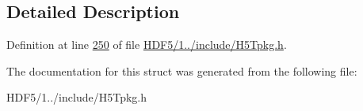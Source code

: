 \subsection{Detailed Description}


Definition at line \hyperlink{_h_d_f5_21_810_81_2include_2_h5_tpkg_8h_source_l00250}{250} of file \hyperlink{_h_d_f5_21_810_81_2include_2_h5_tpkg_8h_source}{H\+D\+F5/1../include/\+H5\+Tpkg.\+h}.



The documentation for this struct was generated from the following file\+:\begin{DoxyCompactItemize}
\item 
H\+D\+F5/1../include/\+H5\+Tpkg.\+h\end{DoxyCompactItemize}
